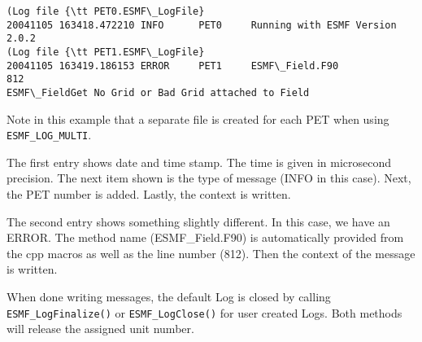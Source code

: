 \begin {verbatim}
(Log file {\tt PET0.ESMF\_LogFile}
20041105 163418.472210 INFO      PET0     Running with ESMF Version 2.0.2   
(Log file {\tt PET1.ESMF\_LogFile}
20041105 163419.186153 ERROR     PET1     ESMF\_Field.F90             812  
ESMF\_FieldGet No Grid or Bad Grid attached to Field
\end {verbatim}

Note in this example that a separate file is created for each PET when using
{\tt ESMF\_LOG\_MULTI}.

The first entry shows date and time stamp.  The time is given in microsecond 
precision.  The next item shown is the type of message (INFO in this case).  
Next, the PET number is added.  Lastly, the context is written.

The second entry shows something slightly different.  In this case, we have
an ERROR.  The method name (ESMF\_Field.F90) is automatically provided from 
the cpp macros as well as the line number (812).  Then the context of the 
message is written.
 
When done writing messages, the default Log is closed by calling 
{\tt ESMF\_LogFinalize()}  or {\tt ESMF\_LogClose()} for user created Logs.  
Both methods will release the assigned unit number.




